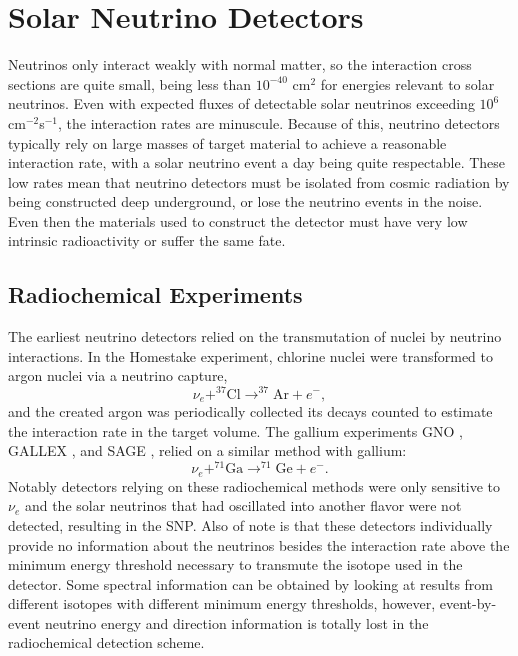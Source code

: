 \chapter{Solar Neutrino Detectors}
\label{ch:detectors}

Neutrinos only interact weakly with normal matter, so the interaction cross sections are quite small, being less than $10^{-40}$ cm$^2$ for energies relevant to solar neutrinos.
Even with expected fluxes of detectable solar neutrinos exceeding $10^6$ cm$^{-2}$s$^{-1}$, the interaction rates are minuscule.
Because of this, neutrino detectors typically rely on large masses of target material to achieve a reasonable interaction rate, with a solar neutrino event a day being quite respectable.
These low rates mean that neutrino detectors must be isolated from cosmic radiation by being constructed deep underground, or lose the neutrino events in the noise.
Even then the materials used to construct the detector must have very low intrinsic radioactivity or suffer the same fate.

\section{Radiochemical Experiments}

The earliest neutrino detectors relied on the transmutation of nuclei by neutrino interactions. 
In the Homestake \cite{homestake} experiment, chlorine nuclei were transformed to argon nuclei via a neutrino capture,
\begin{equation}
\nu_e + ^{37}\mathrm{Cl} \rightarrow ^{37}\mathrm{Ar} + e^-,
\end{equation}
and the created argon was periodically collected its decays counted to estimate the interaction rate in the target volume.
The gallium experiments GNO \cite{gno}, GALLEX \cite{gallex}, and SAGE \cite{sagecombo}, relied on a similar method with gallium:
\begin{equation}
\nu_e + ^{71}\mathrm{Ga} \rightarrow ^{71}\mathrm{Ge} + e^-.
\end{equation}
Notably detectors relying on these radiochemical methods were only sensitive to $\nu_e$ and the solar neutrinos that had oscillated into another flavor were not detected, resulting in the SNP.
Also of note is that these detectors individually provide no information about the neutrinos besides the interaction rate above the minimum energy threshold necessary to transmute the isotope used in the detector. 
Some spectral information can be obtained by looking at results from different isotopes with different minimum energy thresholds, however, event-by-event neutrino energy and direction information is totally lost in the radiochemical detection scheme.

